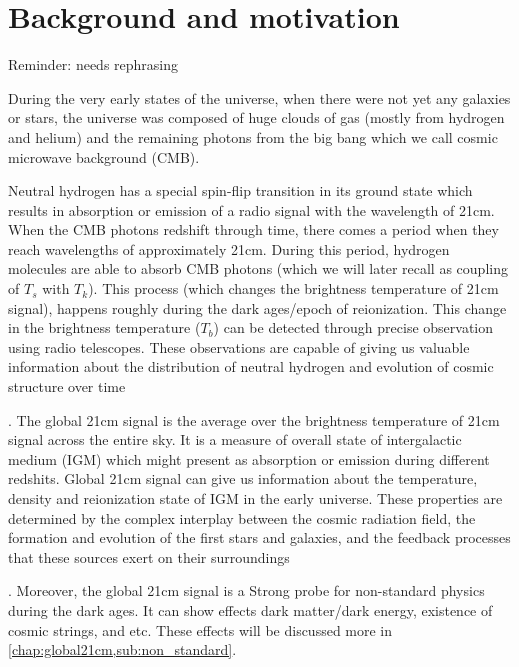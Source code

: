 \documentclass[12pt, TexShade, letterpaper]{report}
\begin{document}
\section{Background and motivation}
Reminder: needs rephrasing\par
During the very early states of the universe, when there were not yet any galaxies or stars, the universe was composed of huge clouds of gas (mostly from hydrogen and helium) and the remaining photons from the big bang which we call cosmic microwave background (CMB). \par
Neutral hydrogen has a special spin-flip transition in its ground state which results in absorption or emission of a radio signal with the wavelength of 21cm. When the CMB photons redshift through time, there comes a period when they reach wavelengths of approximately 21cm. During this period, hydrogen molecules are able to absorb CMB photons (which we will later recall as coupling of $T_s$ with $T_k$). This process (which changes the brightness temperature of 21cm signal), happens roughly during the dark ages/epoch of reionization. This change in the brightness temperature ($T_b$) can be detected through precise observation using radio telescopes. These observations are capable of giving us valuable information about the distribution of neutral hydrogen and evolution of cosmic structure over time\cite{low_frequency}\par.
The global 21cm signal is the average over the brightness temperature of 21cm signal across the entire sky. It is a measure of overall state of intergalactic medium (IGM) which might present as absorption or emission during different redshits. Global 21cm signal can give us information about the temperature, density and reionization state of IGM in the early universe. These properties are determined by the complex interplay between the cosmic radiation field, the formation and evolution of the first stars and galaxies, and the feedback processes that these sources exert on their surroundings\cite{21century}\par.
Moreover, the global 21cm signal is a Strong probe for non-standard physics during the dark ages. It can show effects dark matter/dark energy, existence of cosmic strings, and etc. These effects will be discussed more in \ref{chap:global21cm,sub:non_standard}.\par
\end{document}
